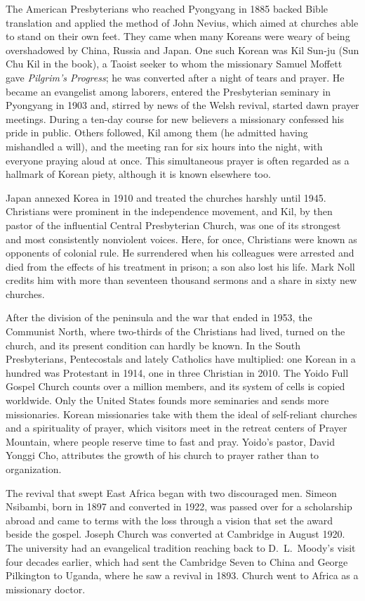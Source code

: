 The American Presbyterians who reached Pyongyang in 1885 backed Bible translation and applied the
method of John Nevius, which aimed at churches able to stand on their own feet. They came when many
Koreans were weary of being overshadowed by China, Russia and Japan. One such Korean was Kil Sun-ju
(Sun Chu Kil in the book), a Taoist seeker to whom the missionary Samuel Moffett gave
\emph{Pilgrim's Progress}; he was converted after a night of tears and prayer. He became an
evangelist among laborers, entered the Presbyterian seminary in Pyongyang in 1903 and, stirred by
news of the Welsh revival, started dawn prayer meetings. During a ten-day course for new believers a
missionary confessed his pride in public. Others followed, Kil among them (he admitted having
mishandled a will), and the meeting ran for six hours into the night, with everyone praying aloud at
once. This simultaneous prayer is often regarded as a hallmark of Korean piety, although it is known
elsewhere too.

Japan annexed Korea in 1910 and treated the churches harshly until 1945. Christians were prominent
in the independence movement, and Kil, by then pastor of the influential Central Presbyterian Church,
was one of its strongest and most consistently nonviolent voices. Here, for once, Christians were
known as opponents of colonial rule. He surrendered when his colleagues were arrested and died from
the effects of his treatment in prison; a son also lost his life. Mark Noll credits him with more
than seventeen thousand sermons and a share in sixty new churches.

After the division of the peninsula and the war that ended in 1953, the Communist North, where
two-thirds of the Christians had lived, turned on the church, and its present condition can hardly
be known. In the South Presbyterians, Pentecostals and lately Catholics have multiplied: one Korean
in a hundred was Protestant in 1914, one in three Christian in 2010. The Yoido Full Gospel Church
counts over a million members, and its system of cells is copied worldwide. Only the United States
founds more seminaries and sends more missionaries. Korean missionaries take with them the ideal of
self-reliant churches and a spirituality of prayer, which visitors meet in the retreat centers of
Prayer Mountain, where people reserve time to fast and pray. Yoido's pastor, David Yonggi Cho,
attributes the growth of his church to prayer rather than to organization.

The revival that swept East Africa began with two discouraged men. Simeon Nsibambi, born in 1897 and
converted in 1922, was passed over for a scholarship abroad and came to terms with the loss through
a vision that set the award beside the gospel. Joseph Church was converted at Cambridge in August
1920. The university had an evangelical tradition reaching back to D.~L.~Moody's visit four decades
earlier, which had sent the Cambridge Seven to China and George Pilkington to Uganda, where he saw a
revival in 1893. Church went to Africa as a missionary doctor.

